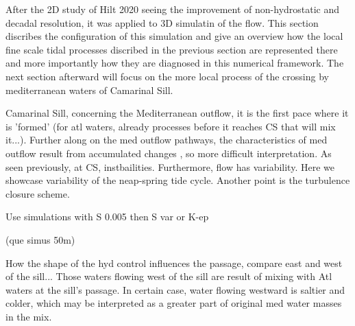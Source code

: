 











After the 2D study of Hilt 2020 seeing the improvement of non-hydrostatic and decadal resolution, it was applied to 3D simulatin of the flow. This section discribes the configuration of this simulation and give an overview how the local fine scale tidal processes discribed in the previous section are represented there and more importantly how they are diagnosed in this numerical framework. The next section afterward will focus on the more local process of the crossing by mediterranean waters of Camarinal Sill.

Camarinal Sill, concerning the Mediterranean outflow, it is the first pace where it is 'formed' (for atl waters, already processes before it reaches CS that will mix it...). Further along on the med outflow pathways, the characteristics of med outflow result from accumulated changes , so more difficult interpretation.  As seen previously, at CS, instbailities. Furthermore, flow has variability. Here we showcase variability of the neap-spring tide cycle. Another point is the turbulence closure scheme.

Use simulations with S 0.005 then S var or K-ep

(que simus 50m)



How the shape of the hyd control influences the passage, compare east and west of the sill... 
Those waters flowing west of the sill are result of mixing with Atl waters at the sill's passage.
In certain case, water flowing westward is saltier and colder, which may be interpreted as a greater part of original med water masses in the mix.


